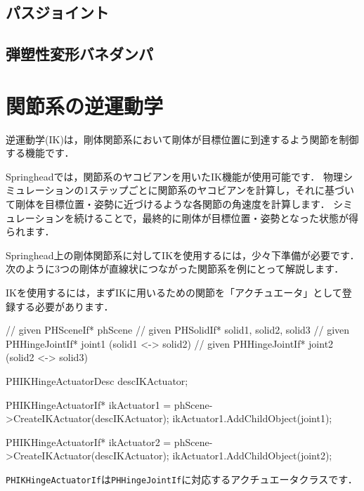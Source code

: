 \KLUDGE %
\subsection*{パスジョイント} \label{sec_phpathjoint}



\KLUDGE %
\subsection*{弾塑性変形バネダンパ}







\section{関節系の逆運動学}

\KLUDGE %
\KLUDGE %
\KLUDGE %
\KLUDGE %

\KLUDGE 逆運動学(IK)は，剛体関節系において剛体が目標位置に到達するよう関節を制御する機能です．

Springheadでは，関節系のヤコビアンを用いたIK機能が使用可能です．
\KLUDGE 物理シミュレーションの1ステップごとに関節系のヤコビアンを計算し，それに基づいて剛体を目標位置・姿勢に近づけるような各関節の角速度を計算します．
\KLUDGE シミュレーションを続けることで，最終的に剛体が目標位置・姿勢となった状態が得られます．

Springhead上の剛体関節系に対してIKを使用するには，少々下準備が必要です．
\KLUDGE 次のように3つの剛体が直線状につながった関節系を例にとって解説します．

\begin{center}
\end{center}


\KLUDGE %
\KLUDGE %
\KLUDGE %
\KLUDGE %

IKを使用するには，まずIKに用いるための関節を「アクチュエータ」として登録する必要があります．
\begin{sourcecode}
// given PHSceneIf* phScene
// given PHSolidIf* solid1, solid2, solid3
// given PHHingeJointIf* joint1 (solid1 <-> solid2)
// given PHHingeJointIf* joint2 (solid2 <-> solid3)

PHIKHingeActuatorDesc descIKActuator;

PHIKHingeActuatorIf* ikActuator1
  = phScene->CreateIKActuator(descIKActuator);
ikActuator1.AddChildObject(joint1);

PHIKHingeActuatorIf* ikActuator2
  = phScene->CreateIKActuator(descIKActuator);
ikActuator1.AddChildObject(joint2);
\end{sourcecode}
\texttt{PHIKHingeActuatorIf}は\texttt{PHHingeJointIf}に対応するアクチュエータクラスです．


